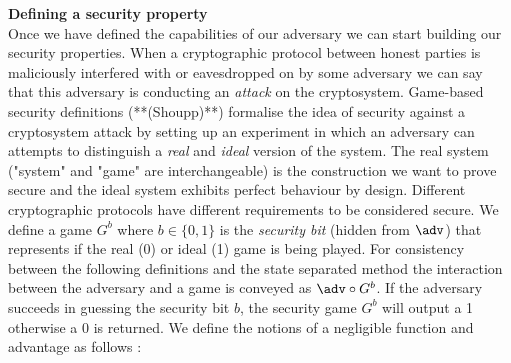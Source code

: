 \documentclass[bsc,frontabs,singlespacing,parskip,deptreport]{infthesis}
\newcommand{\chapsubhead}[1]{\vspace{0.5em}\textbf{\large #1 \vspace{0.5em}}}
\begin{document}
\chapsubhead{Defining a security property}\\
Once we have defined the capabilities of our adversary we can start building our security properties. When a cryptographic protocol between honest parties is maliciously interfered with or eavesdropped on by some adversary we can say that this adversary is conducting an \textit{attack} on the cryptosystem. Game-based security definitions (**(Shoupp)**) formalise the idea of security against a cryptosystem attack by setting up an experiment in which an adversary can attempts to distinguish a \textit{real} and \textit{ideal} version of the system. The real system ("system" and "game" are interchangeable) is the construction we want to prove secure and the ideal system exhibits perfect behaviour by design. Different cryptographic protocols have different requirements to be considered secure. We define a game $G^b$ where $b\in\{0,1\}$ is the \textit{security bit} (hidden from $\adv$) that represents if the real (0) or ideal (1) game is being played. For consistency between the following definitions and the state separated method the interaction between the adversary and a game is conveyed as $\adv\circ G^b$. If the adversary succeeds in guessing the security bit $b$, the security game $G^b$ will output a 1 otherwise a 0 is returned. We define the notions of a negligible function and advantage as follows :

{}
{}
\end{document}

